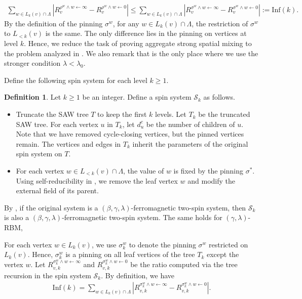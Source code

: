 \documentclass[11pt]{amsart}
\def\+#1{\mathcal{#1}}
\newcommand{\abs}[1]{\ensuremath{\left\vert#1\right\vert}}
\newcommand{\defeq}{:=}
\theoremstyle{definition}
\newtheorem{definition}[theorem]{Definition}
\theoremstyle{remark}
\begin{document}
\begin{align*}
\sum_{w \in L_k(v) \cap \Lambda} \abs{R_v^{\rho^w \land w \gets \infty}-R_v^{\rho^w \land w \gets 0}} \leq \sum_{w \in L_k(v) \cap \Lambda} \abs{R_v^{\sigma^w \land w \gets \infty}-R_v^{\sigma^w \land w \gets 0}} \defeq \text{Inf}(k).
\end{align*}
By the definition of the pinning $\sigma^w$, for any $w \in L_k(v) \cap \Lambda$, the restriction of $\sigma^w$ to $L_{<k}(v)$ is the same. The only difference lies in the pinning on vertices at level $k$. Hence, we reduce the task of proving aggregate strong spatial mixing to the problem analyzed in .
We also remark that  is the only place where we use the stronger condition $\lambda < \lambda_0$. 


Define the following spin system for each level $k \geq 1$.
\begin{definition}\label{def:ferromagnetic-two-spin-system-for-level-k}
Let $k \geq 1$ be an integer. Define a spin system $\+S_k$ as follows. 
\begin{itemize}
    \item Truncate the SAW tree $T$ to keep the first $k$ levels. Let $T_k$ be the truncated SAW tree. For each vertex $u$ in $T_k$, let $d_u^c$ be the number of children of $u$. Note that we have removed cycle-closing vertices, but the pinned vertices remain.  The vertices and edges in $T_k$ inherit the parameters of the original spin system on $T$.
    \item For each vertex $w \in L_{<k}(v) \cap \Lambda$, the value of $w$ is fixed by the pinning $\sigma^*$. Using self-reducibility in , we remove the leaf vertex $w$ and modify the external field of its parent.
\end{itemize}
\end{definition}
By , if the original system is a $(\beta,\gamma,\lambda)$-ferromagnetic two-spin system, then $\+S_k$ is also a $(\beta,\gamma,\lambda)$-ferromagnetic two-spin system. The same holds for $(\gamma,\lambda)$-RBM, 

For each vertex $w \in L_k(v)$, we use $\sigma^w_k$ to denote the pinning $\sigma^w$ restricted on $L_k(v)$. Hence, $\sigma^w_k$ is a pinning on all leaf vertices of the tree $T_k$ except the vertex $w$. Let $R_{v,k}^{\sigma^w_k \land w \gets \infty}$ and $R_{v,k}^{\sigma^w_k \land w \gets 0}$ be the ratio computed via the tree recursion in the spin system $\+S_k$. By definition, we have
\begin{align}\label{eq:influence-bound-level-k}
    \text{Inf}(k) = \sum_{w \in L_k(v) \cap \Lambda} \abs{R_{v,k}^{\sigma^w_k \land w \gets \infty}-R_{v,k}^{\sigma^w_k \land w \gets 0}}.
\end{align}
\end{document}
